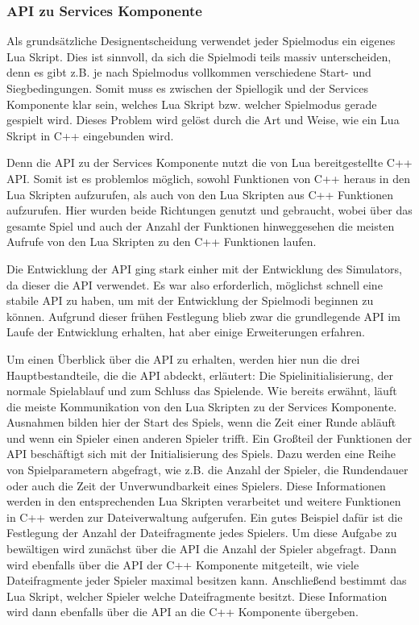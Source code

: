 \subsubsection{API zu Services Komponente}
\label{sec:api-zu-services-komponente}

Als grundsätzliche Designentscheidung verwendet jeder Spielmodus ein eigenes Lua Skript.
Dies ist sinnvoll, da sich die Spielmodi teils massiv unterscheiden, denn es gibt z.B. je nach
Spielmodus vollkommen verschiedene Start- und Siegbedingungen. Somit muss es
zwischen der Spiellogik und der Services Komponente klar sein, welches Lua Skript bzw. welcher
Spielmodus gerade gespielt wird. Dieses Problem wird gelöst durch die Art und Weise, wie
ein Lua Skript in C++ eingebunden wird.

Denn die API zu der Services Komponente nutzt die von Lua bereitgestellte C++ API. Somit
ist es problemlos möglich, sowohl Funktionen von C++ heraus in den Lua Skripten
aufzurufen, als auch von den Lua Skripten aus C++ Funktionen aufzurufen. Hier wurden
beide Richtungen genutzt und gebraucht, wobei über das gesamte Spiel und auch der
Anzahl der Funktionen hinweggesehen die meisten Aufrufe von den Lua Skripten zu den C++ Funktionen laufen.

Die Entwicklung der API ging stark einher mit der Entwicklung des Simulators, da dieser die
API verwendet. Es war also erforderlich, möglichst schnell eine stabile API zu haben, um mit
der Entwicklung der Spielmodi beginnen zu können. Aufgrund dieser frühen Festlegung
blieb zwar die grundlegende API im Laufe der Entwicklung erhalten, hat aber einige
Erweiterungen erfahren.

Um einen Überblick über die API zu erhalten, werden hier nun die drei Hauptbestandteile,
die die API abdeckt, erläutert: Die Spielinitialisierung, der normale Spielablauf und zum
Schluss das Spielende.
Wie bereits erwähnt, läuft die meiste Kommunikation von den Lua Skripten zu der Services
Komponente. Ausnahmen bilden hier der Start des Spiels, wenn die Zeit einer Runde abläuft
und wenn ein Spieler einen anderen Spieler trifft. Ein Großteil der Funktionen der API
beschäftigt sich mit der Initialisierung des Spiels. Dazu werden eine Reihe von
Spielparametern abgefragt, wie z.B. die Anzahl der Spieler, die Rundendauer oder auch die
Zeit der Unverwundbarkeit eines Spielers. Diese Informationen werden in den
entsprechenden Lua Skripten verarbeitet und weitere Funktionen in C++ werden zur
Dateiverwaltung aufgerufen.
Ein gutes Beispiel dafür ist die Festlegung der Anzahl der Dateifragmente jedes Spielers.
Um diese Aufgabe zu bewältigen wird zunächst über die API die Anzahl der Spieler
abgefragt. Dann wird ebenfalls über die API der C++ Komponente mitgeteilt, wie viele
Dateifragmente jeder Spieler maximal besitzen kann. Anschließend bestimmt das Lua
Skript, welcher Spieler welche Dateifragmente besitzt. Diese Information wird dann
ebenfalls über die API an die C++ Komponente übergeben.

